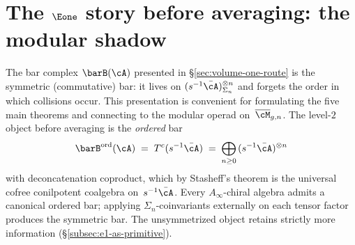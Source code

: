 \section{The \texorpdfstring{$\Eone$}{E1} story before averaging: the modular shadow}
\label{sec:e1-as-primitive}
\label{subsec:e1-as-primitive}

The bar complex $\barB(\cA)$ presented in \S\ref{sec:volume-one-route}
is the symmetric (commutative) bar: it lives on
$(s^{-1}\bar\cA)^{\otimes n}_{\Sigma_n}$ and forgets the order in
which collisions occur. This presentation is convenient for
formulating the five main theorems and connecting to the modular
operad on~$\overline{\cM}_{g,n}$. The level-$2$ object before
averaging is the \emph{ordered} bar
\begin{equation}\label{eq:intro-bar-ord}
\barB^{\mathrm{ord}}(\cA)
\;=\;
T^c(s^{-1}\bar\cA)
\;=\;
\bigoplus_{n \ge 0}\,(s^{-1}\bar\cA)^{\otimes n}
\end{equation}
with deconcatenation coproduct, which by Stasheff's theorem
\textup{\cite{Sta63}} is the universal cofree conilpotent
coalgebra on~$s^{-1}\bar\cA$. Every $A_\infty$-chiral algebra
admits a canonical ordered bar; applying $\Sigma_n$-coinvariants
externally on each tensor factor produces the symmetric bar. The
unsymmetrized object retains strictly more
information (\S\ref{subsec:e1-as-primitive}).

